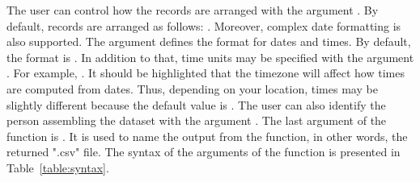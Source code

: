 The user can control how the records are arranged with the argument . By default, records are arranged as follows: . Moreover, complex date formatting is also supported. The argument  defines the format for dates and times. By default, the format is . In addition to that, time units may be specified with the argument  . For example, . It should be highlighted that the timezone will affect how times are computed from dates. Thus, depending on your location, times may be slightly different because the default value is . The user can also identify the person assembling the dataset with the argument . The last argument of the  function is . It is used to name the output from the function, in other words, the returned ".csv" file. The syntax of the arguments of the   function is presented in Table~\ref{table:syntax}.


